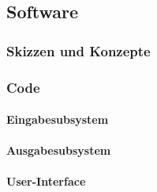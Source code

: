 \documentclass[titlepage,12pt,twoside]{article}
\begin{document}
\subsection{Software}
\label{chap:Fertigungsunterlagen_Software}
\subsubsection{Skizzen und Konzepte}


\subsubsection{Code}
\label{chap:Fertigungsunterlagen_Software_Code}
\paragraph{Eingabesubsystem}

\paragraph{Ausgabesubsystem}

\paragraph{User-Interface}

\newpage
\listoffigures

\newpage

\listoftables

\newpage

\printbibliography

\newpage
\end{document}
